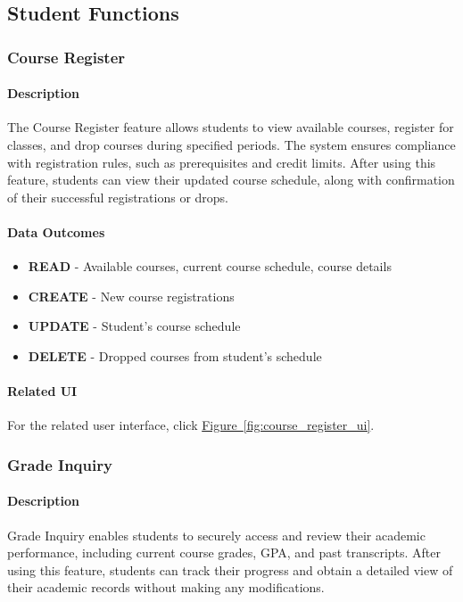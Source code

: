 \documentclass[12pt]{article}
\begin{document}
\subsection{Student Functions}
\subsubsection{Course Register}

\paragraph{Description}
The Course Register feature allows students to view available courses, register for classes, and drop courses during specified periods. The system ensures compliance with registration rules, such as prerequisites and credit limits. After using this feature, students can view their updated course schedule, along with confirmation of their successful registrations or drops.

\paragraph{Data Outcomes}
\begin{itemize}
    \item \textbf{READ} - Available courses, current course schedule, course details
    \item \textbf{CREATE} - New course registrations
    \item \textbf{UPDATE} - Student's course schedule
    \item \textbf{DELETE} - Dropped courses from student's schedule
\end{itemize}

\paragraph{Related UI}
For the related user interface, click \hyperref[fig:course_register_ui]{Figure~\ref*{fig:course_register_ui}}.

\subsubsection{Grade Inquiry}

\paragraph{Description}
Grade Inquiry enables students to securely access and review their academic performance, including current course grades, GPA, and past transcripts. After using this feature, students can track their progress and obtain a detailed view of their academic records without making any modifications.
\end{document}
